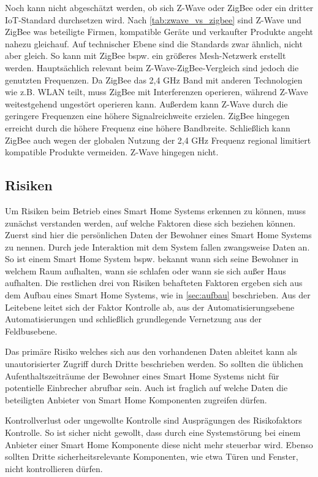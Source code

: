 Noch kann nicht abgeschätzt werden, ob sich Z-Wave oder ZigBee oder ein dritter \ac{IoT}-Standard durchsetzen wird.
Nach \autoref{tab:zwave_vs_zigbee} sind Z-Wave und ZigBee was beteiligte Firmen, kompatible Geräte und verkaufter Produkte angeht nahezu gleichauf.
Auf technischer Ebene sind die Standards zwar ähnlich, nicht aber gleich.
So kann mit ZigBee bspw. ein größeres Mesh-Netzwerk erstellt werden.
Hauptsächlich relevant beim Z-Wave-ZigBee-Vergleich sind jedoch die genutzten Frequenzen.
Da ZigBee das 2,4 GHz Band mit anderen Technologien wie z.B. \ac{WLAN} teilt, muss ZigBee mit Interferenzen operieren, während Z-Wave weitestgehend ungestört operieren kann.
Außerdem kann Z-Wave durch die geringere Frequenzen eine höhere Signalreichweite erzielen.
ZigBee hingegen erreicht durch die höhere Frequenz eine höhere Bandbreite.
Schließlich kann ZigBee auch wegen der globalen Nutzung der 2,4 GHz Frequenz regional limitiert kompatible Produkte vermeiden.
Z-Wave hingegen nicht.

\subsection{Risiken}

Um Risiken beim Betrieb eines Smart Home Systems erkennen zu können, muss zunächst verstanden werden, auf welche Faktoren diese sich beziehen können.
Zuerst sind hier die persönlichen Daten der Bewohner eines Smart Home Systems zu nennen.
Durch jede Interaktion mit dem System fallen zwangsweise Daten an.
So ist einem Smart Home System bspw. bekannt wann sich seine Bewohner in welchem Raum aufhalten, wann sie schlafen oder wann sie sich außer Haus aufhalten.
Die restlichen drei von Risiken behafteten Faktoren ergeben sich aus dem Aufbau eines Smart Home Systems, wie in \autoref{sec:aufbau} beschrieben.
Aus der Leitebene leitet sich der Faktor Kontrolle ab, aus der Automatisierungsebene Automatisierungen und schließlich grundlegende Vernetzung aus der Feldbusebene.

Das primäre Risiko welches sich aus den vorhandenen Daten ableitet kann als unautorisierter Zugriff durch Dritte beschrieben werden.
So sollten die üblichen Aufenthaltszeiträume der Bewohner eines Smart Home Systems nicht für potentielle Einbrecher abrufbar sein.
Auch ist fraglich auf welche Daten die beteiligten Anbieter von Smart Home Komponenten zugreifen dürfen.

Kontrollverlust oder ungewollte Kontrolle sind Ausprägungen des Risikofaktors Kontrolle.
So ist sicher nicht gewollt, dass durch eine Systemstörung bei einem Anbieter einer Smart Home Komponente diese nicht mehr steuerbar wird.
Ebenso sollten Dritte sicherheitsrelevante Komponenten, wie etwa Türen und Fenster, nicht kontrollieren dürfen.

